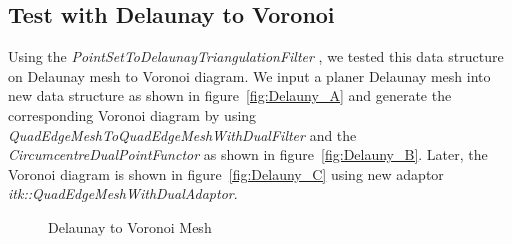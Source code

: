 \documentclass{InsightArticle}
\begin{document}
\subsection{Test with Delaunay to Voronoi}
Using the \emph{PointSetToDelaunayTriangulationFilter} \cite{Rigaud2012b}, we tested this data structure on Delaunay mesh to Voronoi diagram. We input a planer Delaunay mesh into new data structure as shown in figure~\ref{fig:Delauny_A} and generate the corresponding Voronoi diagram by using \emph{QuadEdgeMeshToQuadEdgeMeshWithDualFilter} and the \emph{CircumcentreDualPointFunctor} as shown in figure~\ref{fig:Delauny_B}. Later, the Voronoi diagram is shown in figure~\ref{fig:Delauny_C} using new adaptor \emph{itk::QuadEdgeMeshWithDualAdaptor}.\\
\begin{figure}[!b]
	\centering
	\caption{Delaunay to Voronoi Mesh}
\label{fig:delaunayToVoronoiMesh}
\end{figure}
\end{document}
